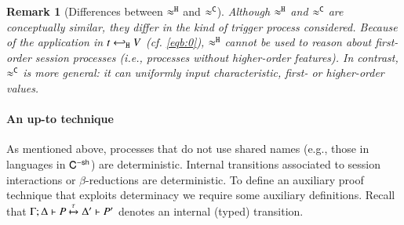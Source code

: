 \documentclass[preprint,11pt]{elsarticle}
\newtheorem{definition}{Definition}[section]
\newtheorem{remark}{Remark}[section]
\begin{document}
{\begin{remark}[Differences between $\approx^\mathtt{H}$ and $\approx^\mathtt{C}$]
Although $\approx^\mathtt{H}$ and $\approx^\mathtt{C}$ are conceptually similar, they differ in the kind of 
trigger process considered. Because of the application in 
$t \hookleftarrow_{\mathtt{H}} V$ (cf. \eqref{eqb:0}), $\approx^\mathtt{H}$ cannot be used to reason about first-order session processes (i.e., processes without higher-order features). In contrast, $\approx^\mathtt{C}$ is more general: it can uniformly input characteristic, first- or higher-order values. 
\end{remark}

%
%
%


\paragraph{An up-to technique}
As mentioned above, processes that do not use shared names (e.g., those in languages in $\mathsf{C}^{-\mathsf{sh}}$) are deterministic. 
Internal transitions associated to session interactions or  
$\beta$-reductions are deterministic.  
To define an auxiliary proof technique that exploits determinacy we require some auxiliary definitions.
Recall that $\Gamma; \Delta \vdash P \xmapsto{\tau} \Delta' \vdash P'$ denotes an internal (typed) transition.
		
}
\end{document}
